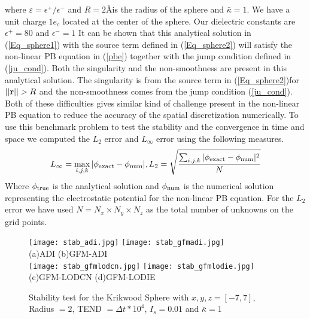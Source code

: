 where $\varepsilon=\epsilon^+ / \epsilon^-$ and $R=2$\AA \text{ }is the radius of the sphere and $\bar{\kappa}=1$. We have a unit charge $1e_c$ located at the center of the sphere. Our dielectric constants are $\epsilon^+=80$ and $\epsilon^-=1$ It can be shown that this analytical solution in (\ref{Eq_sphere1}) with the source term defined in (\ref{Eq_sphere2}) will satisfy the non-linear PB equation in (\ref{pbe}) together with the jump condition defined in (\ref{ju_cond}). Both the singularity and the non-smoothness are present in this analytical solution. The singularity is from the source term in (\ref{Eq_sphere2})for $||{\bf r}|| >R$ and the non-smoothness comes from the jump condition (\ref{ju_cond}). Both of these difficulties gives similar kind of challenge present in the non-linear PB equation to reduce the accuracy of the spatial discretization numerically. To use this benchmark problem to test the stability and the convergence in time and space we computed the $L_2$ error and $L_\infty$ error using the following measures. 
$$L_\infty=\max\limits_{i,j,k}|\phi_{\rm exact}-\phi_{\rm num}|, L_2 = \sqrt{\frac{\sum_{i,j,k}|\phi_{\rm exact}-\phi_{\rm num}|^2}{N}}$$
Where $\phi_{\rm true}$ is the analytical solution and $\phi_{\rm num}$ is the numerical solution representing the electrostatic potential for the non-linear PB equation. For the $L_2$ error we have used $N= N_x \times N_y \times N_z$ as the total number of unknowns on the grid points. 


\begin{figure}
	\centering
	\texttt{[image: stab\_adi.jpg]}
	\texttt{[image: stab\_gfmadi.jpg]}\\
	(a)ADI\hspace*{2.5in} (b)GFM-ADI\\ 	
	\texttt{[image: stab\_gfmlodcn.jpg]}
	\texttt{[image: stab\_gfmlodie.jpg]}\\
	(c)GFM-LODCN \hspace*{2in} (d)GFM-LODIE
	\caption{Stability test for the Krikwood Sphere with $x,y,z = [-7,7]$, Radius $=2$, TEND $=\Delta t * 10^4$, $I_s=0.01$ and $\bar \kappa = 1$}	
\end{figure}

 
 
